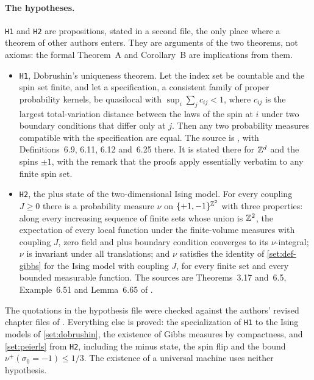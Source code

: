 \paragraph{The hypotheses.} \texttt{H1} and \texttt{H2} are propositions, stated in a second file, the only place where a theorem of other authors enters. They are arguments of the two theorems, not axioms: the formal Theorem~A and Corollary~B are implications from them.
\begin{itemize}
\item \texttt{H1}, Dobrushin's uniqueness theorem. Let the index set be countable and the spin set finite, and let a specification, a consistent family of proper probability kernels, be quasilocal with $\sup_i\sum_jc_{ij}<1$, where $c_{ij}$ is the largest total-variation distance between the laws of the spin at $i$ under two boundary conditions that differ only at $j$. Then any two probability measures compatible with the specification are equal. The source is \cite[Theorem~6.31]{FriedliVelenik17}, with Definitions~6.9, 6.11, 6.12 and~6.25 there. It is stated there for $\mathbb{Z}^d$ and the spins $\pm1$, with the remark that the proofs apply essentially verbatim to any finite spin set.
\item \texttt{H2}, the plus state of the two-dimensional Ising model. For every coupling $J\ge0$ there is a probability measure $\nu$ on $\{+1,-1\}^{\mathbb{Z}^2}$ with three properties: along every increasing sequence of finite sets whose union is $\mathbb{Z}^2$, the expectation of every local function under the finite-volume measures with coupling $J$, zero field and plus boundary condition converges to its $\nu$-integral; $\nu$ is invariant under all translations; and $\nu$ satisfies the identity of \cref{set:def-gibbs} for the Ising model with coupling $J$, for every finite set and every bounded measurable function. The sources are Theorems~3.17 and~6.5, Example~6.51 and Lemma~6.65 of \cite{FriedliVelenik17}.
\end{itemize}
The quotations in the hypothesis file were checked against the authors' revised chapter files of \cite{FriedliVelenik17}. Everything else is proved: the specialization of \texttt{H1} to the Ising models of \cref{set:dobrushin}, the existence of Gibbs measures by compactness, and \cref{set:peierls} from \texttt{H2}, including the minus state, the spin flip and the bound $\nu^+(\sigma_0=-1)\le1/3$. The existence of a universal machine uses neither hypothesis.

